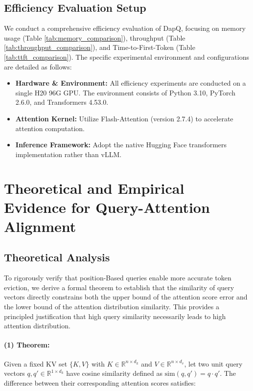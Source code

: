 \documentclass[11pt]{article}
\begin{document}
\subsection{Efficiency Evaluation Setup}
We conduct a comprehensive efficiency evaluation of DapQ, focusing on memory usage (Table \ref{tab:memory_comparison}), throughput (Table \ref{tab:throughput_comparison}), and Time-to-First-Token (Table \ref{tab:ttft_comparison}). The specific experimental environment and configurations are detailed as follows:

\begin{itemize}[leftmargin=*, nosep]
    \item \textbf{Hardware \& Environment:} All efficiency experiments are conducted on a single H20 96G GPU. The environment consists of Python 3.10, PyTorch 2.6.0, and Transformers 4.53.0.
    \item \textbf{Attention Kernel:} Utilize Flash-Attention (version 2.7.4) to accelerate attention computation.
    \item \textbf{Inference Framework:} Adopt the native Hugging Face transformers implementation rather than vLLM.
\end{itemize}



\section{Theoretical and Empirical Evidence for Query-Attention Alignment}

\subsection{Theoretical Analysis}

To rigorously verify that position-Based queries enable more accurate token eviction, we derive a formal theorem to establish that the similarity of query vectors directly constrains both the upper bound of the attention score error and the lower bound of the attention distribution similarity. This provides a principled justification that high query similarity necessarily leads to high attention distribution.

\paragraph{(1) Theorem:}
Given a fixed KV set $\{K, V\}$ with $K \in \mathbb{R}^{n \times d_k}$ and $V \in \mathbb{R}^{n \times d_v}$, let two unit query vectors $q, q' \in \mathbb{R}^{1 \times d_k}$ have cosine similarity defined as $\text{sim}(q, q') = q \cdot q'$.
The difference between their corresponding attention scores satisfies:
\end{document}
